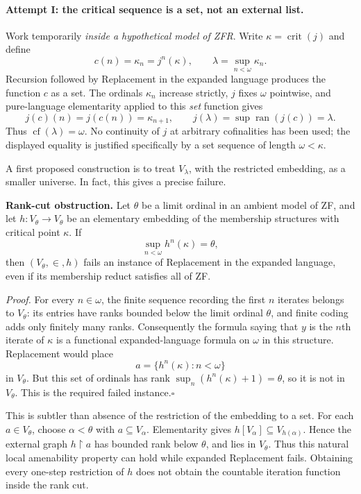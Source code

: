 \documentclass[11pt]{article}
\begin{document}
\paragraph{Attempt I: the critical sequence is a set, not an external list.}
Work temporarily \emph{inside a hypothetical model of ZFR}.  Write
$\kappa=\operatorname{crit}(j)$ and define
\begin{equation}\label{ra152:critical-sequence}
 c(n)=\kappa_n=j^n(\kappa),\qquad
 \lambda=\sup_{n<\omega}\kappa_n.
\end{equation}
Recursion followed by Replacement in the expanded language produces the
function $c$ as a set.  The ordinals $\kappa_n$ increase strictly, $j$ fixes
$\omega$ pointwise, and pure-language elementarity applied to this \emph{set}
function gives
\[
 j(c)(n)=j(c(n))=\kappa_{n+1},\qquad
 j(\lambda)=\sup\operatorname{ran}(j(c))=\lambda.
\]
Thus $\operatorname{cf}(\lambda)=\omega$.  No continuity of $j$ at arbitrary
cofinalities has been used; the displayed equality is justified specifically
by a set sequence of length $\omega<\kappa$.

A first proposed construction is to treat $V_\lambda$, with the restricted
embedding, as a smaller universe.  In fact, this gives a precise failure.

\textbf{Rank-cut obstruction.}
Let $\theta$ be a limit ordinal in an ambient model of ZF, and let
$h:V_\theta\to V_\theta$ be an elementary embedding of the membership
structures with critical point $\kappa$.  If
\[
 \sup_{n<\omega}h^n(\kappa)=\theta,
\]
then $(V_\theta,\in,h)$ fails an instance of Replacement in the expanded
language, even if its membership reduct satisfies all of ZF.

\emph{Proof.}
For every $n\in\omega$, the finite sequence recording the first $n$ iterates
belongs to $V_\theta$: its entries have ranks bounded below the limit ordinal
$\theta$, and finite coding adds only finitely many ranks.  Consequently the
formula saying that $y$ is the $n$th iterate of $\kappa$ is a functional
expanded-language formula on $\omega$ in this structure.  Replacement would
place
\[
 a=\{h^n(\kappa):n<\omega\}
\]
in $V_\theta$.  But this set of ordinals has rank
$\sup_n(h^n(\kappa)+1)=\theta$, so it is not in $V_\theta$.  This is the
required failed instance.\hfill$\square$

This is subtler than absence of the restriction of the embedding to a set.
For each $a\in V_\theta$, choose $\alpha<\theta$ with $a\subseteq V_\alpha$.
Elementarity gives $h[V_\alpha]\subseteq V_{h(\alpha)}$.  Hence the external
graph $h\!\upharpoonright\!a$ has bounded rank below $\theta$, and lies in
$V_\theta$.  Thus this natural local amenability property can hold while
expanded Replacement fails.  Obtaining every one-step restriction of $h$
does not obtain the countable iteration function inside the rank cut.
\end{document}
